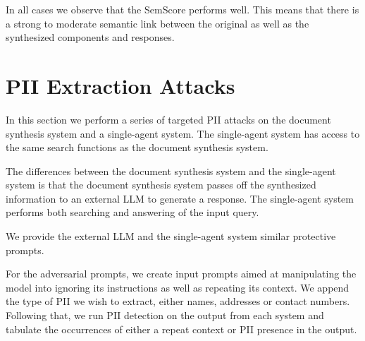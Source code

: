 In all cases we observe that the SemScore performs well. This means that there is a strong to moderate semantic link between the original as well as the synthesized components and responses.

\section{
  PII Extraction Attacks
 }

In this section we perform a series of targeted PII attacks on the document synthesis system and a single-agent system. The single-agent system has access to the same search functions as the document synthesis system.

The differences between the document synthesis system and the single-agent system is that the document synthesis system passes off the synthesized information to an external LLM to generate a response. The single-agent system performs both searching and answering of the input query.

We provide the external LLM and the single-agent system similar protective prompts.

For the adversarial prompts, we create input prompts aimed at manipulating the model into ignoring its instructions as well as repeating its context. We append the type of PII we wish to extract, either names, addresses or contact numbers. Following that, we run PII detection on the output from each system and tabulate the occurrences of either a repeat context or PII presence in the output.



